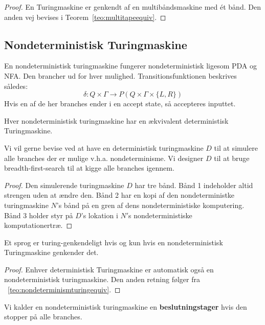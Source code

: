 \begin{proof}
En Turingmaskine er genkendt af en multibåndsmaskine med ét bånd. Den anden vej bevises i Teorem~\ref{teo:multitapeequiv}.
\end{proof}


\subsection{Nondeterministisk Turingmaskine}%
\label{subsec:nondeterministicturingmachine}

En nondeterministisk turingmaskine fungerer nondeterministisk ligesom PDA og NFA. Den brancher ud for hver mulighed. Transitionsfunktionen beskrives således:
\[ \delta : Q \times \Gamma \longrightarrow P(Q \times \Gamma \times \{L, R\})\] Hvis en af de her branches ender i en accept state, så accepteres inputtet.

\begin{theorem}
\label{teo:nondeterminismturingequiv}
Hver nondeterministisk turingmaskine har en ækvivalent deterministisk Turingmaskine.
\end{theorem}

Vi vil gerne bevise ved at have en deterministisk turingmaskine $D$ til at simulere alle branches der er mulige v.h.a. nondeterminisme. Vi designer $D$ til at bruge breadth-first-search til at kigge alle branches igennem.

\begin{proof}
Den simulerende turingmaskine $D$ har tre bånd. Bånd 1 indeholder altid strengen uden at ændre den. Bånd 2 har en kopi af den nondeterministke turingmaskine $N$'s bånd på en gren af dens nondeterministiske komputering. Bånd 3 holder styr på $D$'s lokation i $N'$s nondeterministiske komputationertræ. %
\end{proof}

\begin{corollary}
Et sprog er turing-genkendeligt hvis og kun hvis en nondeterministisk Turingmaskine genkender det.
\end{corollary}

\begin{proof}
Enhver deterministisk Turingmaskine er automatisk også en nondeterministisk turingmaskine. Den anden retning følger fra ~\ref{teo:nondeterminismturingequiv}.
\end{proof}

Vi kalder en nondeterministisk turingmaskine en \textbf{beslutningstager} hvis den stopper på alle branches.






